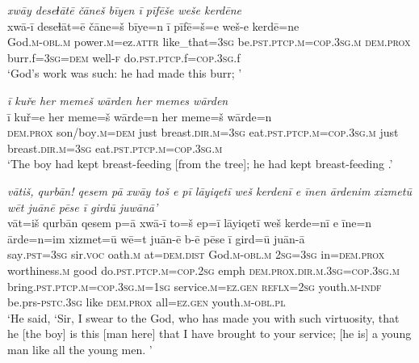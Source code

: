 \ea \label{ZQ.42}
\textit{xwāy deseɫātē čāneš bīyen ī pīfēše weše kerdēne} \\ 
\gll xwā-ī deseɫāt=ē čāne=š bīye=n ī pīfē=š=e weš-e kerdē=ne \\ 
 God\textsc{.m}\textsc{-obl}\textsc{.m} power\textsc{.m}=ez.\textsc{attr} like\_that\textsc{=3sg} be\textsc{.pst}\textsc{.ptcp}\textsc{.m}\textsc{=cop}\textsc{.3sg}\textsc{.m} \textsc{dem.prox} burr.f\textsc{=3sg}\textsc{=dem} well\textsc{-f} do\textsc{.pst}\textsc{.ptcp}.f\textsc{=cop}\textsc{.3sg}.f \\ 
\glt `God’s work was such: he had made this burr; '
\z 
 
\ea \label{ZQ.44}
\textit{ī kuře her memeš wārden her memes wārden} \\ 
\gll ī kuř=e her meme=š wārde=n her meme=š wārde=n \\ 
 \textsc{dem.prox} son/boy\textsc{.m}\textsc{=dem} just breast\textsc{.dir}\textsc{.m}\textsc{=3sg} eat\textsc{.pst}\textsc{.ptcp}\textsc{.m}\textsc{=cop}\textsc{.3sg}\textsc{.m} just breast\textsc{.dir}\textsc{.m}\textsc{=3sg} eat\textsc{.pst}\textsc{.ptcp}\textsc{.m}\textsc{=cop}\textsc{.3sg}\textsc{.m} \\ 
\glt `The boy had kept breast-feeding [from the tree]; he had kept breast-feeding .'
\z 
 
\ea \label{ZQ.54}
\textit{vātiš, qurbān! qesem pā xwāy toš e pī lāyiqetī weš kerdenī e īnen ārdenim xizmetū wēt juānē pēse ī girdū juwānā’} \\ 
\gll vāt=iš qurbān qesem p=ā xwā-ī to=š ep=ī lāyiqetī weš kerde=nī e īne=n ārde=n=im xizmet=ū wē=t juān-ē b-ē pēse ī gird=ū juān-ā \\ 
 say\textsc{.pst}\textsc{=3sg} sir.\textsc{voc} oath\textsc{.m} at=\textsc{dem.dist} God\textsc{.m}\textsc{-obl}\textsc{.m} \textsc{2sg}\textsc{=3sg} in=\textsc{dem.prox} worthiness\textsc{.m} good do\textsc{.pst}\textsc{.ptcp}\textsc{.m}\textsc{=cop}\textsc{.\textsc{2sg}} emph \textsc{dem.prox}\textsc{.dir}\textsc{.m}\textsc{.3sg}\textsc{=cop}\textsc{.3sg}\textsc{.m} bring\textsc{.pst}\textsc{.ptcp}\textsc{.m}\textsc{=cop}\textsc{.3sg}\textsc{.m}\textsc{=\textsc{1sg}} service\textsc{.m}\textsc{=ez.gen} \textsc{reflx}\textsc{=\textsc{2sg}} youth\textsc{.m}\textsc{-indf} be.prs\textsc{-pstc}\textsc{.3sg} like \textsc{dem.prox} all\textsc{=ez.gen} youth\textsc{.m}\textsc{-obl}\textsc{.pl} \\ 
\glt `He said, ‘Sir, I swear to the God, who has made you with such virtuosity, that he [the boy] is this [man here] that I have brought to your service; [he is] a young man like all the young men. '
\z 
 
